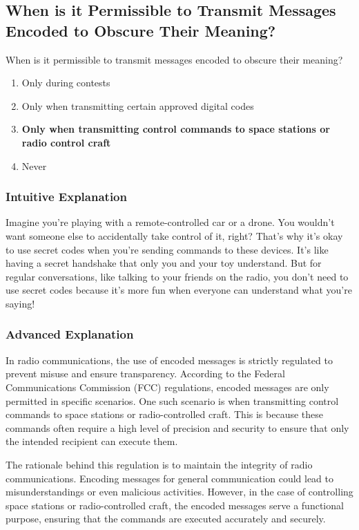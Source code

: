 \subsection{When is it Permissible to Transmit Messages Encoded to Obscure Their Meaning?}
\label{T1D03}

\begin{tcolorbox}[colback=gray!10!white,colframe=black!75!black,title=T1D03]
When is it permissible to transmit messages encoded to obscure their meaning?
\begin{enumerate}[label=\Alph*)]
    \item Only during contests
    \item Only when transmitting certain approved digital codes
    \item \textbf{Only when transmitting control commands to space stations or radio control craft}
    \item Never
\end{enumerate}
\end{tcolorbox}

\subsubsection{Intuitive Explanation}
Imagine you’re playing with a remote-controlled car or a drone. You wouldn’t want someone else to accidentally take control of it, right? That’s why it’s okay to use secret codes when you’re sending commands to these devices. It’s like having a secret handshake that only you and your toy understand. But for regular conversations, like talking to your friends on the radio, you don’t need to use secret codes because it’s more fun when everyone can understand what you’re saying!

\subsubsection{Advanced Explanation}
In radio communications, the use of encoded messages is strictly regulated to prevent misuse and ensure transparency. According to the Federal Communications Commission (FCC) regulations, encoded messages are only permitted in specific scenarios. One such scenario is when transmitting control commands to space stations or radio-controlled craft. This is because these commands often require a high level of precision and security to ensure that only the intended recipient can execute them.

The rationale behind this regulation is to maintain the integrity of radio communications. Encoding messages for general communication could lead to misunderstandings or even malicious activities. However, in the case of controlling space stations or radio-controlled craft, the encoded messages serve a functional purpose, ensuring that the commands are executed accurately and securely.


